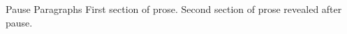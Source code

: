 \documentclass[14pt,t]{beamer}
\begin{document}
\begin{frame}{Pause Paragraphs}
First section of prose.
\pause
Second section of prose revealed after pause.
\end{frame}
\end{document}
